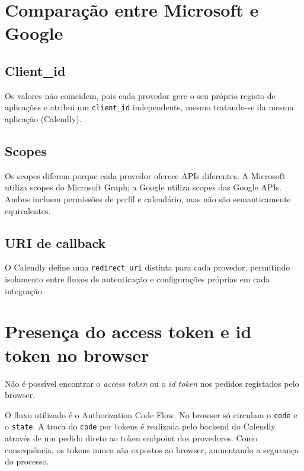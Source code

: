 \section{Comparação entre Microsoft e Google}

\subsection*{Client\_id}

Os valores não coincidem, pois cada provedor gere o seu próprio registo de aplicações e atribui um
\texttt{client\_id} independente, mesmo tratando-se da mesma aplicação (Calendly).

\subsection*{Scopes}

Os scopes diferem porque cada provedor oferece APIs diferentes.  
A Microsoft utiliza scopes do Microsoft Graph; a Google utiliza scopes das Google APIs.  
Ambos incluem permissões de perfil e calendário, mas não são semanticamente equivalentes.

\subsection*{URI de callback}

O Calendly define uma \texttt{redirect\_uri} distinta para cada provedor, permitindo isolamento entre fluxos
de autenticação e configurações próprias em cada integração.

\section{Presença do access token e id token no browser}

Não é possível encontrar o \textit{access token} ou o \textit{id token} nos pedidos registados pelo browser.

O fluxo utilizado é o Authorization Code Flow. No browser só circulam o \texttt{code} e o \texttt{state}.  
A troca do \texttt{code} por tokens é realizada pelo backend do Calendly através de um pedido direto ao
token endpoint dos provedores.  
Como consequência, os tokens nunca são expostos ao browser, aumentando a segurança do processo.
